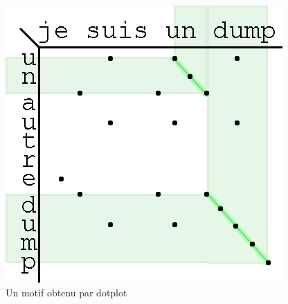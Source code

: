\begin{figure}[!h]
  \begin{center}
  \includegraphics[scale=0.75]{res/04-2-dotplot.png}
  \caption{Un motif obtenu par dotplot}
  \label{04-1-dotplot}
  \end{center}
\end{figure}